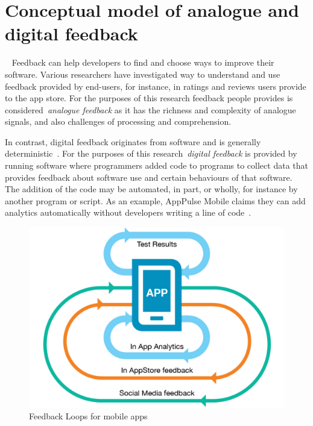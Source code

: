 \section{Conceptual model of analogue and digital feedback}~\label{analogue-and-digital-feedback}
Feedback can help developers to find and choose ways to improve their software. Various researchers have investigated way to understand and use feedback provided by end-users, for instance, in ratings and reviews users provide to the app store. For the purposes of this research feedback people provides is considered~\emph{analogue feedback} as it has the richness and complexity of analogue signals, and also challenges of processing and comprehension.

In contrast, digital feedback originates from software and is generally deterministic~. For the purposes of this research~\emph{digital feedback} is provided by running software where programmers added code to programs to collect data that provides feedback about software use and certain behaviours of that software. The addition of the code may be automated, in part, or wholly, for instance by another program or script. As an example, AppPulse Mobile claims they can add analytics automatically without developers writing a line of code~.

\begin{figure}
    \includegraphics[width=\linewidth]{images/mobile-analytics-playbook/feedback-loops-for-mobile-apps.pdf}
    \caption{Feedback Loops for mobile apps~\cite{harty_aymer_playbook_2016}}
    \label{fig:map2015-feedback-loops-for-mobile-apps}
\end{figure}

